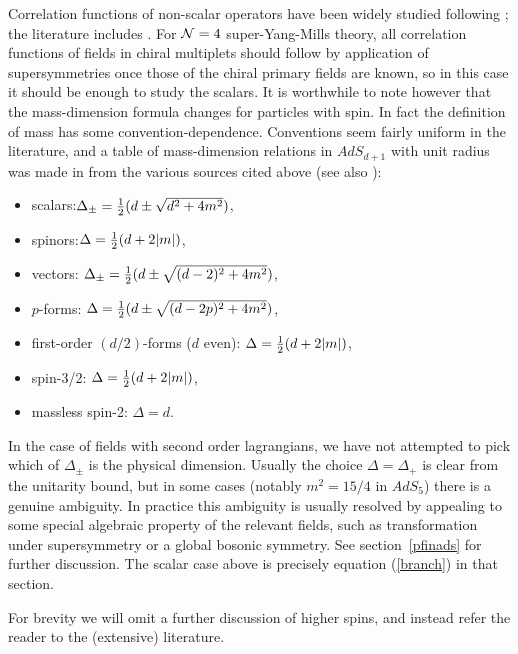 Correlation functions of non-scalar operators have been widely studied
following \cite{Witten:1998qj}; the literature includes
\cite{Henningson:1998cd, Ghezelbash:1998pf, Arutyunov:1998ve,
Arutyunov:1998xt, l'Yi:1998yt, Volovich:1998tj, l'Yi:1998pi, l'Yi:1998eu,
Koshelev:1998tu, Rashkov:1999ji, Polishchuk:1999nh}.  For ${\cal N}=4$
super-Yang-Mills theory, all correlation functions of fields in chiral
multiplets should follow by application of supersymmetries once those of
the chiral primary fields are known, so in this case it should be enough to
study the scalars.  It is worthwhile to note however that the
mass-dimension formula changes for particles with spin.  In fact the
definition of mass has some convention-dependence.  Conventions seem 
fairly uniform in the literature, and a table of mass-dimension
relations in $AdS_{d+1}$ with unit radius was made in
\cite{Freedman:1999gp} from the various sources cited above (see also
\cite{Ferrara:1998ej}):
  \begin{itemize}
\item scalars:\quad $\Delta_{\pm} = {1 \over 2} (d \pm \sqrt{d^2
+4m^2})$,
\item spinors:\quad  $\Delta = {1 \over 2} (d + 2|m|)$,
\item vectors:\quad
$ \Delta_{\pm} = {1 \over 2} (d \pm \sqrt{(d-2)^2 + 4m^2})$,
\item $p$-forms:\quad
$ \Delta = {1 \over 2} (d \pm \sqrt{(d-2p)^2 + 4m^2})$,
\item first-order $(d/2)$-forms ($d$ even):\quad
$\Delta={1\over 2}(d + 2|m|)$,
\item spin-3/2:\quad
$\Delta = {1 \over 2} (d + 2|m|)$,
\item massless spin-2:\quad
$\Delta = d$.
  \end{itemize}
 In the case of fields with second order lagrangians, we have not attempted
to pick which of $\Delta_\pm$ is the physical dimension.  Usually the
choice $\Delta=\Delta_+$ is clear from the unitarity bound, but in some
cases (notably $m^2 = 15/4$ in $AdS_5$) there is a genuine ambiguity.  In
practice this ambiguity is usually resolved by appealing to some special
algebraic property of the relevant fields, such as transformation under
supersymmetry or a global bosonic symmetry.  
See section~\ref{pfinads} for further discussion.  The scalar case above is 
precisely equation (\ref{branch}) in that section. 

 For brevity we will omit a further discussion of higher spins, and instead
refer the reader to the (extensive) literature. 



